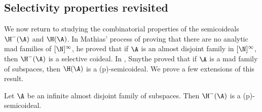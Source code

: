 \documentclass[11pt,reqno]{amsart}
\begin{document}
\subsection{Selectivity properties revisited}
We now return to studying the combinatorial properties of the semicoideals $\H^-(\A)$ and $\H(\A)$. In Mathias' process of proving that there are no analytic mad families of $[\N]^\infty$, he proved that if $\A$ is an almost disjoint family in $[\N]^\infty$, then $\H^-(\A)$ is a selective coideal. In \cite{S19}, Smythe proved that if $\A$ is a mad family of subspaces, then $\H(\A)$ is a (p)-semicoideal. We prove a few extensions of this result. 

\begin{proposition}
\label{prop:H^-(A).is.(p)}
    Let $\A$ be an infinite almost disjoint family of subspaces. Then $\H^-(\A)$ is a (p)-semicoideal.
\end{proposition}
\end{document}
